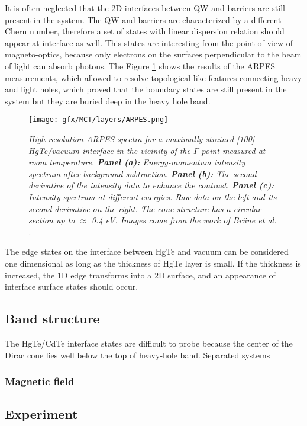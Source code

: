 \documentclass[titlepage,a4paper]{book}
\begin{document}
It is often neglected that the 2D interfaces between QW and barriers are still present in the system. The QW and barriers are characterized by a different Chern number, therefore a set of states with linear dispersion relation should appear at interface as well. This states are interesting from the point of view of magneto-optics, because only electrons on the surfaces perpendicular to the beam of light can absorb photons. The Figure \ref{fig:Layers_ARPES} shows the results of the ARPES measurements, which allowed to resolve topological-like features connecting heavy and light holes, which proved that the boundary states are still present in the system but they are buried deep in the heavy hole band. 

\begin{figure}[ht]
	\centering
	\texttt{[image: gfx/MCT/layers/ARPES.png]}
	\vspace{-10pt}
	\caption{\textit{High resolution ARPES spectra for a maximally strained [100] HgTe/vacuum interface in the vicinity of the $\Gamma$-point measured at room temperature. \textbf{Panel (a):} Energy-momentum intensity spectrum after background subtraction. \textbf{Panel (b):} The second derivative of the intensity data to enhance the contrast. \textbf{Panel (c):} Intensity spectrum at different energies. Raw data on the left and its second derivative on the right. The cone structure has a circular section up to $\approx$ 0.4 eV. Images come from the work of Brüne \textit{et al.} \cite{Brune_State2}.}}
	\label{fig:Layers_ARPES}
\end{figure} 

The edge states on the interface between HgTe and vacuum can be considered one dimensional as long as the thickness of HgTe layer is small. If the thickness is increased, the 1D edge transforms into a 2D surface, and an appearance of interface surface states should occur.

\subsection{Band structure}
The HgTe/CdTe interface states are difficult to probe because the center of the Dirac cone lies well below the top of heavy-hole band.
Separated systems

\subsubsection{Magnetic field}

\subsection{Experiment}
\end{document}

